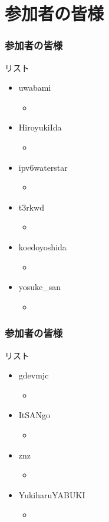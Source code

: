 \documentclass[cjk,dvipdfmx,10pt,compress,%
hyperref={bookmarks=true,bookmarksnumbered=true,bookmarksopen=false,%
colorlinks=false,%
pdftitle={第 132 回 関西 Debian 勉強会},%
pdfauthor={かわだ},%
pdfsubject={資料},%
}]{beamer}
\begin{document}
\section{参加者の皆様}
\begin{frame}[fragile]
  \frametitle{参加者の皆様}
  \begin{block}{リスト}

\begin{itemize}
\item uwabami
\begin{itemize}
  \item
\end{itemize}
\item HiroyukiIda
\begin{itemize}
  \item
\end{itemize}
\item ipv6waterstar
\begin{itemize}
  \item
\end{itemize}
\item t3rkwd
\begin{itemize}
  \item
\end{itemize}
\item koedoyoshida
\begin{itemize}
  \item
\end{itemize}
\item yosuke\_san
\begin{itemize}
  \item
\end{itemize}
\end{itemize}

  \end{block}
\end{frame}

\begin{frame}[fragile]
  \frametitle{参加者の皆様}
  \begin{block}{リスト}
	\begin{itemize}
	\item gdevmjc
	\begin{itemize}
	  \item
	\end{itemize}
	\item ItSANgo
	\begin{itemize}
	  \item
	\end{itemize}
	\item znz
	\begin{itemize}
	  \item
	\end{itemize}
	\item YukiharuYABUKI 
	\begin{itemize}
	  \item
	\end{itemize}
	\end{itemize}
  \end{block}
\end{frame}
\end{document}

